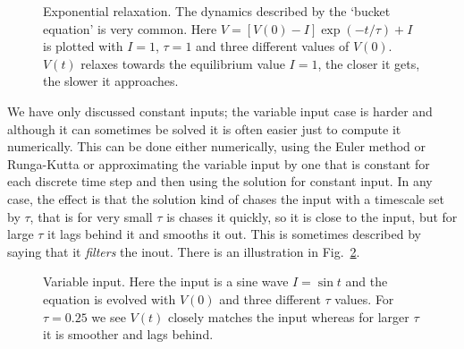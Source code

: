 \documentclass[11pt,a4paper]{scrartcl}
\begin{document}
\begin{figure}
\begin{center}

\end{center}
\caption{Exponential relaxation. The dynamics described by the
  \lq{}bucket equation\rq{} is very common. Here $V=[V(0)-I]\exp(-t/\tau)+I$ is plotted with $I=1$, $\tau=1$ and three different values of $V(0)$. $V(t)$ relaxes towards the equilibrium value $I=1$, the closer it gets, the slower it approaches.\label{bucket_v}}
\end{figure}

We have only discussed constant inputs; the variable input case is
harder and although it can sometimes be solved it is often easier just
to compute it numerically. This can be done either numerically, using
the Euler method or Runga-Kutta or approximating the variable input by
one that is constant for each discrete time step and then using the
solution for constant input. In any case, the effect is that the
solution kind of chases the input with a timescale set by $\tau$, that
is for very small $\tau$ is chases it quickly, so it is close to the
input, but for large $\tau$ it lags behind it and smooths it out. This
is sometimes described by saying that it \textsl{filters} the inout. There is an illustration in Fig.~\ref{chasing}.

\begin{figure}
\begin{center}

\end{center}
\caption{Variable input. Here the input is a sine wave $I=\sin{t}$ and the equation is evolved with $V(0)$ and three different $\tau$ values. For $\tau=0.25$ we see $V(t)$ closely matches the input whereas for larger $\tau$ it is smoother and lags behind.\label{chasing}}
\end{figure}
\end{document}

